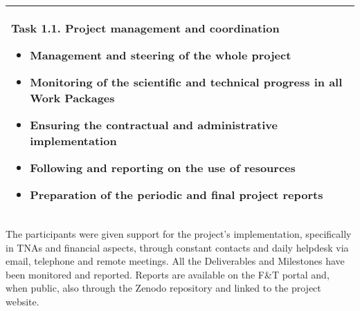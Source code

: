 \begin{table}[H]
\begin{tabular}{|p{}|}
        \begin{minipage}[t]{\textwidth}
        \setlength{\parindent}{15pt}
                Task 1.1. Project management and coordination
    		\begin{itemize}
    		    \item Management and steering of the whole project
                    \item Monitoring of the scientific and technical progress in all Work Packages
                    \item Ensuring the contractual and administrative implementation
                    \item Following and reporting on the use of resources
                    \item Preparation of the periodic and final project reports
    		\end{itemize} 
    		\vspace*{0.10em}
	\end{minipage}        
        \\
        \hline
    \end{tabular}
    \vspace{0.5em}\vfill
\end{table}


The participants were given support for the project's implementation, specifically in TNAs and financial aspects, through constant contacts and daily helpdesk via email, telephone and remote meetings.
All the Deliverables and Milestones have been monitored and reported. Reports are available on the F\&T portal and, when public, also through the Zenodo repository and linked to the project website.

